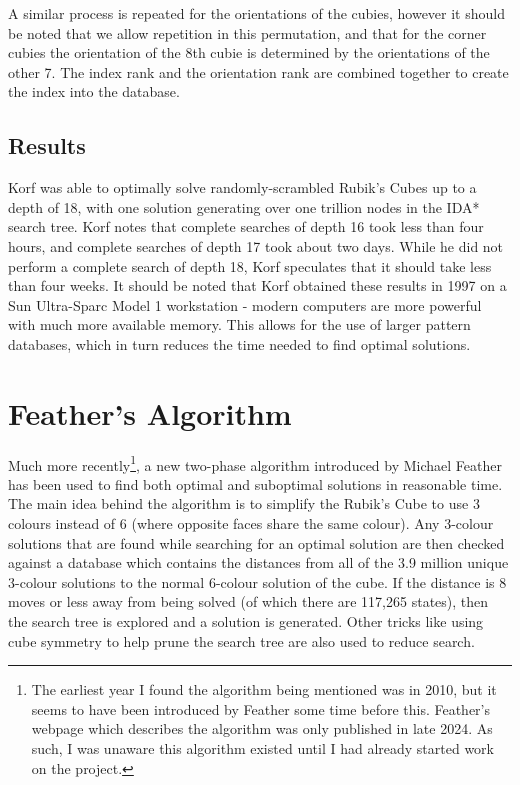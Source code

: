 A similar process is repeated for the orientations of the cubies, however it should be noted that we allow repetition in this permutation, and that for the corner cubies the orientation of the 8th cubie is determined by the orientations of the other 7. The index rank and the orientation rank are combined together to create the index into the database.

\subsection{Results}
Korf was able to optimally solve randomly-scrambled Rubik's Cubes up to a depth of 18, with one solution generating over one trillion nodes in the IDA* search tree. Korf notes that complete searches of depth 16 took less than four hours, and complete searches of depth 17 took about two days. While he did not perform a complete search of depth 18, Korf speculates that it should take less than four weeks. It should be noted that Korf obtained these results in 1997 on a Sun Ultra-Sparc Model 1 workstation - modern computers are more powerful with much more available memory. This allows for the use of larger pattern databases, which in turn reduces the time needed to find optimal solutions.

\section{Feather's Algorithm}
Much more recently\footnote{The earliest year I found the algorithm being mentioned was in 2010, but it seems to have been introduced by Feather some time before this. Feather's webpage \cite{feather} which describes the algorithm was only published in late 2024. As such, I was unaware this algorithm existed until I had already started work on the project.}, a new two-phase algorithm introduced by Michael Feather \cite{feather} has been used to find both optimal and suboptimal solutions in reasonable time. The main idea behind the algorithm is to simplify the Rubik's Cube to use 3 colours instead of 6 (where opposite faces share the same colour). Any 3-colour solutions that are found while searching for an optimal solution are then checked against a database which contains the distances from all of the 3.9 million unique 3-colour solutions to the normal 6-colour solution of the cube. If the distance is 8 moves or less away from being solved (of which there are 117,265 states), then the search tree is explored and a solution is generated. Other tricks like using cube symmetry to help prune the search tree are also used to reduce search.

